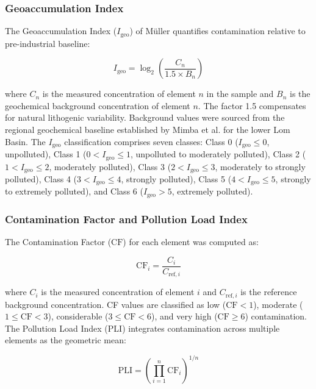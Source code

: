 \documentclass[preprint,12pt,authoryear]{elsarticle}
\begin{document}
\subsubsection{Geoaccumulation Index}

The Geoaccumulation Index ($I_\text{geo}$) of M\"{u}ller \citep{Muller1969} quantifies contamination relative to pre-industrial baseline:

\begin{equation}
I_\text{geo} = \log_2 \left(\frac{C_n}{1.5 \times B_n}\right)
\label{eq:igeo}
\end{equation}

\noindent where $C_n$ is the measured concentration of element $n$ in the sample and $B_n$ is the geochemical background concentration of element $n$. The factor 1.5 compensates for natural lithogenic variability. Background values were sourced from the regional geochemical baseline established by Mimba et al. \citep{Mimba2018} for the lower Lom Basin. The $I_\text{geo}$ classification comprises seven classes: Class 0 ($I_\text{geo} \leq 0$, unpolluted), Class 1 ($0 < I_\text{geo} \leq 1$, unpolluted to moderately polluted), Class 2 ($1 < I_\text{geo} \leq 2$, moderately polluted), Class 3 ($2 < I_\text{geo} \leq 3$, moderately to strongly polluted), Class 4 ($3 < I_\text{geo} \leq 4$, strongly polluted), Class 5 ($4 < I_\text{geo} \leq 5$, strongly to extremely polluted), and Class 6 ($I_\text{geo} > 5$, extremely polluted).

\subsubsection{Contamination Factor and Pollution Load Index}

The Contamination Factor ($\text{CF}$) for each element was computed as:

\begin{equation}
\text{CF}_i = \frac{C_i}{C_{\text{ref},i}}
\label{eq:cf}
\end{equation}

\noindent where $C_i$ is the measured concentration of element $i$ and $C_{\text{ref},i}$ is the reference background concentration. CF values are classified as low ($\text{CF} < 1$), moderate ($1 \leq \text{CF} < 3$), considerable ($3 \leq \text{CF} < 6$), and very high ($\text{CF} \geq 6$) contamination. The Pollution Load Index (PLI) integrates contamination across multiple elements as the geometric mean:

\begin{equation}
\text{PLI} = \left(\prod_{i=1}^{n} \text{CF}_i\right)^{1/n}
\label{eq:pli}
\end{equation}
\end{document}
